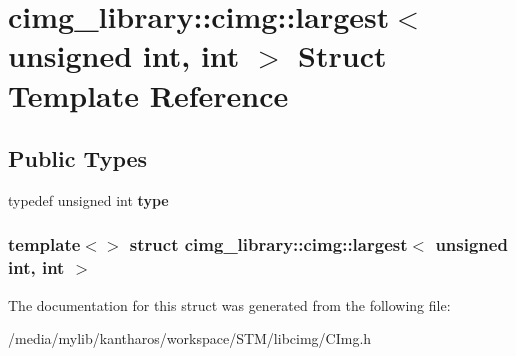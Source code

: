 \hypertarget{structcimg__library_1_1cimg_1_1largest_3_01unsigned_01int_00_01int_01_4}{
\section{cimg\_\-library::cimg::largest$<$ unsigned int, int $>$ Struct Template Reference}
\label{structcimg__library_1_1cimg_1_1largest_3_01unsigned_01int_00_01int_01_4}
}
\subsection*{Public Types}
\begin{DoxyCompactItemize}
\item 
\hypertarget{structcimg__library_1_1cimg_1_1largest_3_01unsigned_01int_00_01int_01_4_aeb99df70e86d112740138b48ec6afbe9}{
typedef unsigned int {\bfseries type}}
\label{structcimg__library_1_1cimg_1_1largest_3_01unsigned_01int_00_01int_01_4_aeb99df70e86d112740138b48ec6afbe9}

\end{DoxyCompactItemize}
\subsubsection*{template$<$$>$ struct cimg\_\-library::cimg::largest$<$ unsigned int, int $>$}



The documentation for this struct was generated from the following file:\begin{DoxyCompactItemize}
\item 
/media/mylib/kantharos/workspace/STM/libcimg/CImg.h\end{DoxyCompactItemize}
